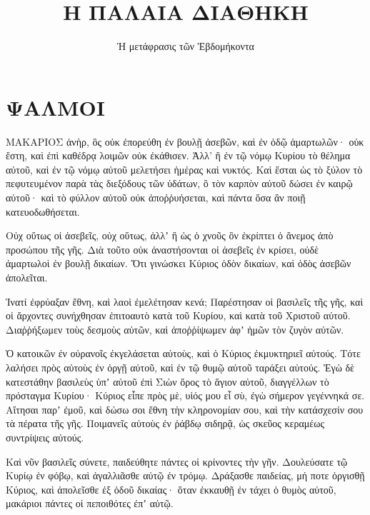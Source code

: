 

\title{Η ΠΑΛΑΙΑ ΔΙΑΘΗΚΗ}
\author{Ἡ μετάφρασις τῶν Ἑβδομήκοντα}
\date{}


\begin{spacing}{1.1}
\maketitle

\tableofcontents

\begin{multicols}{2}


\end{multicols}
\chapter{ΨΑΛΜΟΙ}
\begin{multicols}{2}

 ΜΑΚΑΡΙΟΣ ἀνὴρ, ὃς οὐκ ἐπορεύθη ἐν βουλῇ ἀσεβῶν, καὶ ἐν ὁδῷ ἁμαρτωλῶν· οὐκ ἔστη, καὶ ἐπὶ καθέδρᾳ λοιμῶν οὐκ ἐκάθισεν.
Ἀλλ’ ἢ ἐν τῷ νόμῳ Κυρίου τὸ θέλημα αὐτοῦ, καὶ ἐν τῷ νόμῳ αὐτοῦ μελετήσει ἡμέρας καὶ νυκτός.
Καὶ ἔσται ὡς τὸ ξύλον τὸ πεφυτευμένον παρὰ τὰς διεξόδους τῶν ὑδάτων, ὃ τὸν καρπὸν αὐτοῦ δώσει ἐν καιρῷ αὐτοῦ· καὶ τὸ φύλλον αὐτοῦ οὐκ ἀποῤῥυήσεται, καὶ πάντα ὅσα ἂν ποιῇ κατευοδωθήσεται.

Οὐχ οὕτως οἱ ἀσεβεῖς, οὐχ οὕτως, ἀλλʼ ἢ ὡς ὁ χνοῦς ὃν ἐκρίπτει ὁ ἄνεμος ἀπὸ προσώπου τῆς γῆς.
Διὰ τοῦτο οὐκ ἀναστήσονται οἱ ἀσεβεῖς ἐν κρίσει, οὐδὲ ἁμαρτωλοὶ ἐν βουλῇ δικαίων.
Ὅτι γινώσκει Κύριος ὁδὸν δικαίων, καὶ ὁδὸς ἀσεβῶν ἀπολεῖται.

 Ἱνατί ἐφρύαξαν ἔθνη, καὶ λαοὶ ἐμελέτησαν κενά;
Παρέστησαν οἱ βασιλεῖς τῆς γῆς, καὶ οἱ ἄρχοντες συνήχθησαν ἐπιτοαυτὸ κατὰ τοῦ Κυρίου, καὶ κατὰ τοῦ Χριστοῦ αὐτοῦ.
Διαῤῥήξωμεν τοὺς δεσμοὺς αὐτῶν, καὶ ἀποῤῥίψωμεν ἀφʼ ἡμῶν τὸν ζυγὸν αὐτῶν.

Ὁ κατοικῶν ἐν οὐρανοῖς ἐκγελάσεται αὐτοὺς, καὶ ὁ Κύριος ἐκμυκτηριεῖ αὐτούς.
Τότε λαλήσει πρὸς αὐτοὺς ἐν ὀργῇ αὐτοῦ, καὶ ἐν τῷ θυμῷ αὐτοῦ ταράξει αὐτούς.
Ἐγὼ δὲ κατεστάθην βασιλεὺς ὑπʼ αὐτοῦ ἐπὶ Σιὼν ὄρος τὸ ἅγιον αὐτοῦ,
διαγγέλλων τὸ πρόσταγμα Κυρίου· Κύριος εἶπε πρὸς μὲ, υἱός μου εἶ σὺ, ἐγὼ σήμερον γεγέννηκά σε.
Αἴτησαι παρʼ ἐμοῦ, καὶ δώσω σοι ἔθνη τὴν κληρονομίαν σου, καὶ τὴν κατάσχεσίν σου τὰ πέρατα τῆς γῆς.
Ποιμανεῖς αὐτοὺς ἐν ῥάβδῳ σιδηρᾷ, ὡς σκεῦος κεραμέως συντρίψεις αὐτούς.

Καὶ νῦν βασιλεῖς σύνετε, παιδεύθητε πάντες οἱ κρίνοντες τὴν γῆν.
Δουλεύσατε τῷ Κυρίῳ ἐν φόβῳ, καὶ ἀγαλλιᾶσθε αὐτῷ ἐν τρόμῳ.
Δράξασθε παιδείας, μή ποτε ὀργισθῇ Κύριος, καὶ ἀπολεῖσθε ἐξ ὁδοῦ δικαίας· ὅταν ἐκκαυθῇ ἐν τάχει ὁ θυμὸς αὐτοῦ, μακάριοι πάντες οἱ πεποιθότες ἐπʼ αὐτῷ.


\end{multicols}
\end{spacing}
